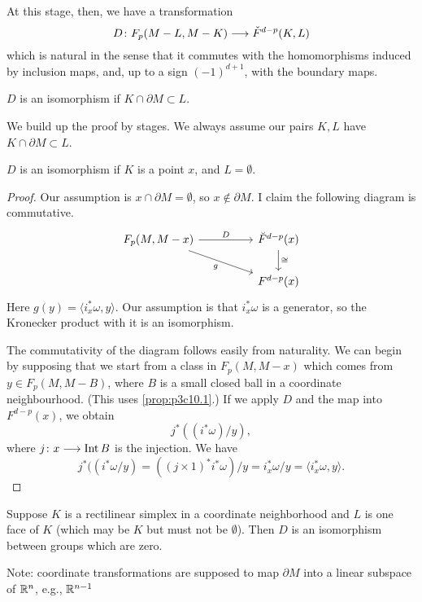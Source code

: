 \documentclass[../main]{subfiles}
\begin{document}
At this stage, then, we have a transformation
\[D \colon F_p(M-L,M-K) \longrightarrow \check{F}^{d-p}(K,L)\]
which is natural in the sense that it commutes with the homomorphisms induced by inclusion maps, and, up to a sign $(-1)^{d+1}$, with the boundary maps.
\begin{theorem}\label{thm:p3c10.6}
$D$ is an isomorphism if $K \cap \partial M \subset L$.
\end{theorem}
We build up the proof by stages. We always assume our pairs $K,L$ have $K \cap \partial M \subset L$.
\begin{remark}\label{rmk:p3c10.7}
$D$ is an isomorphism if $K$ is a point $x$, and $L = \emptyset$.
\end{remark}
\begin{proof}
Our assumption is $x \cap \partial M  = \emptyset$, so $x \not\in \partial M$. I claim the following diagram is commutative.
\[
\begin{tikzcd}
{F_p(M, M - x)} \arrow[rrd, "g"'] \arrow[rr, "D"] &  & \breve F^{d - p}(x) \arrow[d, "\cong"] \\
                                                  &  & F^{d - p}(x)                          
\end{tikzcd}
\]
Here $g(y) = \langle i_x^* \omega, y \rangle$. Our assumption is that $i_x^* \omega$ is a generator, so the Kronecker product with it is an isomorphism.

The commutativity of the diagram follows easily from naturality. We can begin by supposing that we start from a class in $F_p(M,M-x)$ which comes from $y \in F_p(M,M-B)$, where $B$ is a small closed ball in a coordinate neighbourhood. (This uses \ref{prop:p3c10.1}.) If we apply $D$ and the map into $F^{d-p}(x)$, we obtain
\[j^*((i^* \omega)/y),\]
where $j \colon x \longrightarrow \mathop{\mathrm{Int}} B$ is the injection. We have
\[j^*((i^*\omega/y) = ((j \times 1)^* i^* \omega)/y = i_x^*\omega/y = \langle i_x^* \omega, y \rangle.\]
\end{proof}
\begin{remark}\label{rmk:p3c10.8}
Suppose $K$ is a rectilinear simplex in a coordinate neighborhood and $L$ is one face of $K$ (which may be $K$ but must not be $\emptyset$). Then $D$ is an isomorphism between groups which are zero.
\end{remark}
Note: coordinate transformations are supposed to map $\partial M$ into a linear subspace of $\mathbb{R}^n$, e.g., $\mathbb{R}^{n-1}$
\end{document}
